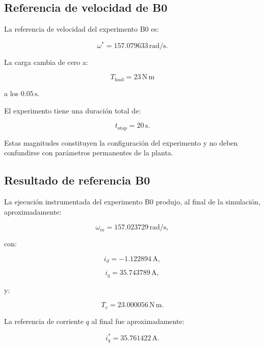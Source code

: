 \subsection{Referencia de velocidad de B0}

La referencia de velocidad del experimento B0 es:

\begin{equation}
\omega^\ast=157.079633\,\mathrm{rad/s}.
\end{equation}

La carga cambia de cero a:

\begin{equation}
T_{\mathrm{load}}=23\,\mathrm{N\,m}
\end{equation}

a los $0.05\,\mathrm{s}$.

El experimento tiene una duración total de:

\begin{equation}
t_{\mathrm{stop}}=20\,\mathrm{s}.
\end{equation}

Estas magnitudes constituyen la configuración del experimento y no deben confundirse con parámetros permanentes de la planta.

\subsection{Resultado de referencia B0}

La ejecución instrumentada del experimento B0 produjo, al final de la simulación, aproximadamente:

\begin{equation}
\omega_m=157.023729\,\mathrm{rad/s},
\end{equation}

con:

\begin{equation}
i_d=-1.122894\,\mathrm{A},
\end{equation}

\begin{equation}
i_q=35.743789\,\mathrm{A},
\end{equation}

y:

\begin{equation}
T_e=23.000056\,\mathrm{N\,m}.
\end{equation}

La referencia de corriente $q$ al final fue aproximadamente:

\begin{equation}
i_q^\ast=35.761422\,\mathrm{A}.
\end{equation}

